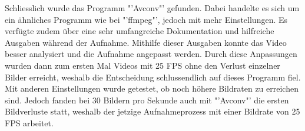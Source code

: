 Schliesslich wurde das Programm "'Avconv"' gefunden. Dabei handelte es sich um ein ähnliches Programm wie bei "'ffmpeg"', jedoch mit mehr Einstellungen. Es verfügte zudem über eine sehr umfangreiche Dokumentation und hilfreiche Ausgaben während der Aufnahme. Mithilfe dieser Ausgaben konnte das Video besser analysiert und die Aufnahme angepasst werden. Durch diese Anpassungen wurden dann zum ersten Mal Videos mit 25 FPS ohne den Verlust einzelner Bilder erreicht, weshalb die Entscheidung schlussendlich auf dieses Programm fiel. Mit anderen Einstellungen wurde getestet, ob noch höhere Bildraten zu erreichen sind. Jedoch fanden bei 30 Bildern pro Sekunde auch mit "'Avconv"' die ersten Bildverluste statt, weshalb der jetzige Aufnahmeprozess mit einer Bildrate von 25 FPS arbeitet. \cite{Avconv}